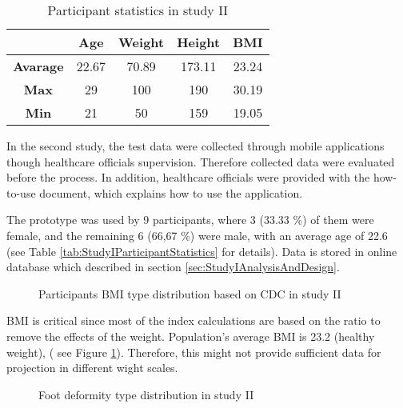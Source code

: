 \begin{table}[htbp]
\begin{center}
\caption{Participant statistics in study II}
\vspace{23pt}
      \begin{tabular}{|c|c|c|c|c|} \hline
          & \textbf{Age} & \textbf{Weight} & \textbf{Height} & \textbf{BMI} \\ \hline
        \textbf{Avarage} & 22.67 & 70.89 & 173.11 & 23.24 \\ \hline
        \textbf{Max} & 29 & 100 & 190 & 30.19 \\ \hline
        \textbf{Min} & 21 & 50 & 159 & 19.05 \\ \hline
    \end{tabular}
\label{tab:StudyIIParticipantStatistics}
\end{center}
\end{table}

In the second study, the test data were collected through mobile applications though healthcare officials supervision. Therefore collected data were evaluated before the process. In addition, healthcare officials were provided with the how-to-use document, which explains how to use the application. 

The prototype was used by 9 participants, where 3 (33.33 \%) of them were female, and the remaining 6 (66,67 \%) were male, with an average age of 22.6 (see Table \ref{tab:StudyIParticipantStatistics} for details). Data is stored in online database which described in section \ref{sec:StudyIAnalysisAndDesign}. 

\begin{figure}[htbp]
\centering
{}
\caption{Participants BMI type distribution based on CDC in study II}
\label{fig:StudyIIParticipantsBMITypeDistribution}
\end{figure}

BMI is critical since most of the index calculations are based on the ratio to remove the effects of the weight. Population's average BMI is 23.2 (healthy weight), ( see Figure \ref{fig:StudyIIParticipantsBMITypeDistribution}). Therefore, this might not provide sufficient data for projection in different wight scales.

\begin{figure}[htbp]
\centering
{}
\caption{Foot deformity type distribution in study II}
\label{fig:StudyIIFootDeformityTypeDistribution}
\end{figure} 

